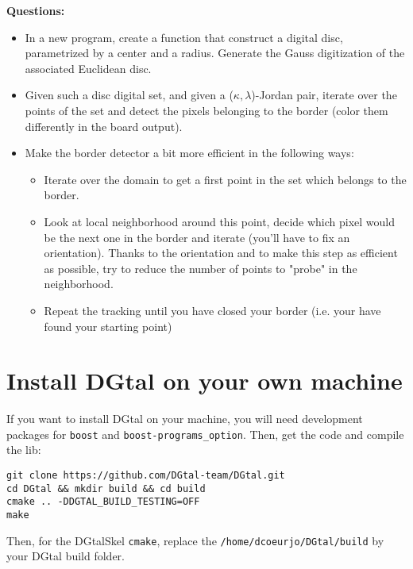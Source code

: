 \documentclass[a4paper, 11pt]{article}
\begin{document}
\noindent \textbf{Questions:}
\begin{itemize}
	\item In a new program, create a function that construct a digital disc, parametrized by a center and a radius. Generate the Gauss digitization of the associated Euclidean disc.
	
	\item Given such a disc digital set, and given a ($\kappa,\lambda$)-Jordan pair, iterate over the points of the set and detect the pixels belonging to the border (color them differently in the board output).
	
	\item Make the border detector a bit more efficient in the following ways:
	\begin{itemize}
		\item Iterate over the domain to get a first point in the set which belongs to the border.
		\item Look at local neighborhood around this point, decide which pixel would be the next one in the border and iterate (you'll have to fix an orientation). Thanks to the orientation and to make this step as efficient as possible, try to reduce the number of points to "probe" in the neighborhood.
		\item Repeat the tracking until you have closed your border (i.e. your have found your starting point)
	\end{itemize}
\end{itemize}


\appendix
\section*{Install DGtal on your own machine}

\par If you want to install DGtal on your machine, you will need development  packages for \texttt{boost} and \texttt{boost-programs\_option}. Then, get the code and compile the lib: 
\begin{verbatim}
git clone https://github.com/DGtal-team/DGtal.git
cd DGtal && mkdir build && cd build
cmake .. -DDGTAL_BUILD_TESTING=OFF
make
\end{verbatim}
\par Then, for the DGtalSkel \texttt{cmake}, replace the \texttt{/home/dcoeurjo/DGtal/build} by your DGtal build folder.
\end{document}
